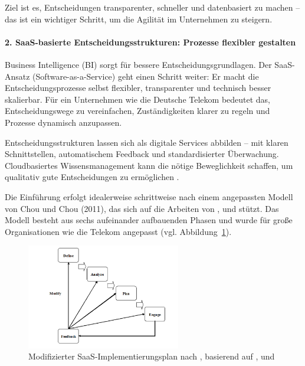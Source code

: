 \documentclass[12pt,a4paper]{article}
\begin{document}
\noindent Ziel ist es, Entscheidungen transparenter, schneller und datenbasiert zu machen – das ist ein wichtiger Schritt, um die Agilität im Unternehmen zu steigern.

\paragraph{2. SaaS-basierte Entscheidungsstrukturen: Prozesse flexibler gestalten}

Business Intelligence (BI) sorgt für bessere Entscheidungsgrundlagen. Der SaaS-Ansatz (Software-as-a-Service) geht einen Schritt weiter: Er macht die Entscheidungsprozesse selbst flexibler, transparenter und technisch besser skalierbar. Für ein Unternehmen wie die Deutsche Telekom bedeutet das, Entscheidungswege zu vereinfachen, Zuständigkeiten klarer zu regeln und Prozesse dynamisch anzupassen.

\noindent Entscheidungsstrukturen lassen sich als digitale Services abbilden – mit klaren Schnittstellen, automatischem Feedback und standardisierter Überwachung. Cloudbasiertes Wissensmanagement kann die nötige Beweglichkeit schaffen, um qualitativ gute Entscheidungen zu ermöglichen \parencite{churakova2010software}.

\noindent Die Einführung erfolgt idealerweise schrittweise nach einem angepassten Modell von Chou und Chou (2011), das sich auf die Arbeiten von \parencite{murthy2010tapping}, \parencite{chong2006multi} und \parencite{buyya2008market} stützt. Das Modell besteht aus sechs aufeinander aufbauenden Phasen und wurde für große Organisationen wie die Telekom angepasst (vgl. Abbildung~\ref{fig:saas-implementation-plan}).

\begin{figure}[H]
	\centering
	\includegraphics[width=0.6\textwidth]{./images/saas_implementation_plan.png}
	\caption{Modifizierter SaaS-Implementierungsplan nach \textcite{chou2011cloud}, basierend auf \textcite{murthy2010tapping}, \textcite{chong2006multi} und \textcite{buyya2008market}}
	\label{fig:saas-implementation-plan}
\end{figure}
\end{document}
